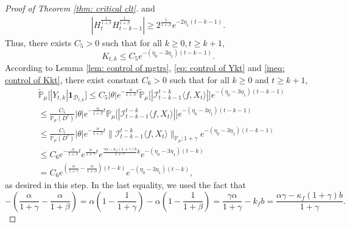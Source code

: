 \documentclass[12pt,a4paper]{amsart}
\theoremstyle{plain}
\theoremstyle{definition}
\numberwithin{equation}{section}
\begin{document}
\begin{proof}[Proof of Theorem \ref{thm: critical clt}]
    and
\begin{align}
    |H_t^{\frac{1}{1+\beta}}H_{t-k-1}^{\frac{1}{1+\beta}}|
    \geq 2^{\frac{1}{1+\beta}} e^{-2\eta_1(t-k-1)}.
\end{align}
    Thus, there exists  $C_5> 0$ such that for all $k \geq 0, t\geq k+1$,
\begin{equation}
\label{ineq: control of Kkt}
     K_{t,k}
     \leq C_5 e^{-(\eta_0 - 3\eta_1)(t-k-1)}.
\end{equation}
    According to Lemma \ref{lem: control of mgtrs}, \eqref{eq: control of Ykt} and \eqref{ineq: control of Kkt}, 
    there exist constant $C_6>0$ such that for all $k\geq 0$ and $t\geq k+1$,
\begin{align}
\label{eq: Y in D}
    &\mathbb{\tilde{P}}_{\mu}\big[|Y_{t,k}|\mathbf{1}_{\mathcal{D}_{t,k}}\big]
    \leq C_5|\theta|e^{-\frac{\alpha}{1+\beta}t}\mathbb{\tilde{P}}_{\mu}\big[|\mathcal{I}_{t-k-1}^{t-k}\langle f,X_t\rangle|\big]e^{-(\eta_0 - 3\eta_1)(t-k-1)}
    \\&\leq \frac{C_5}{\mathbb{P}_{\mu}(D^c)}|\theta|e^{-\frac{\alpha}{1+\beta}t}\mathbb{P}_{\mu}\big[|\mathcal{I}_{t-k-1}^{t-k}\langle f,X_t\rangle|\big]e^{-(\eta_0 - 3\eta_1)(t-k-1)}
    \\&\leq \frac{C_5}{\mathbb{P}_{\mu}(D^c)}|\theta|e^{-\frac{\alpha}{1+\beta}t}\|\mathcal{I}_{t-k-1}^{t-k}\langle f,X_t\rangle\|_{\mathbb P_\mu; 1+\gamma} e^{-(\eta_0 - 3\eta_1)(t-k - 1)}
    \\&\leq C_6 e^{-\frac{\alpha}{1+\beta}t}e^{\frac{\alpha}{1+\gamma}t}e^{\frac{\gamma \alpha-\kappa_f(1+\gamma)b}{1+\gamma}k}e^{-(\eta_0 - 3\eta_1)(t-k)}
    \\&= C_6 e^{(\frac{\alpha}{1+\gamma}-\frac{\alpha}{1+\beta})(t-k)}e^{-(\eta_0 - 3\eta_1)(t-k)},
\end{align}
    as desired in this step.
    In the last equality, we used the fact that
\[
    -(\frac{\alpha}{1+\gamma}-\frac{\alpha}{1+\beta})
    = \alpha(1-\frac{1}{1+\gamma}) - \alpha(1-\frac{1}{1+\beta})
    = \frac{\gamma \alpha}{1+\gamma} - k_f b
    =\frac{\alpha \gamma-\kappa_f(1+\gamma)b}{1+\gamma}.
\]


\end{proof}
\end{document}
